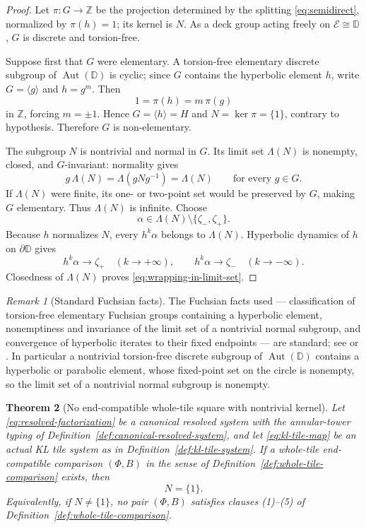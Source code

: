 \documentclass[11pt,reqno]{amsart}
\newtheorem{theorem}{Theorem}[section]
\theoremstyle{definition}
\theoremstyle{remark}
\newtheorem{remark}[theorem]{Remark}
\begin{document}
\begin{proof}
Let \(\pi\colon G\to\mathbb Z\) be the projection determined by the splitting \eqref{eq:semidirect}, normalized by \(\pi(h)=1\); its kernel is \(N\).  As a deck group acting freely on \(\mathcal E\cong\mathbb D\), \(G\) is discrete and torsion-free.

Suppose first that \(G\) were elementary.  A torsion-free elementary discrete subgroup of \(\operatorname{Aut}(\mathbb D)\) is cyclic; since \(G\) contains the hyperbolic element \(h\), write \(G=\langle g\rangle\) and \(h=g^m\).  Then
\[
1=\pi(h)=m\,\pi(g)
\]
in \(\mathbb Z\), forcing \(m=\pm1\).  Hence \(G=\langle h\rangle=H\) and \(N=\ker\pi=\{1\}\), contrary to hypothesis.  Therefore \(G\) is non-elementary.

The subgroup \(N\) is nontrivial and normal in \(G\).  Its limit set \(\Lambda(N)\) is nonempty, closed, and \(G\)-invariant: normality gives
\[
g\,\Lambda(N)=\Lambda(gNg^{-1})=\Lambda(N)
\qquad\text{for every } g\in G.
\]
If \(\Lambda(N)\) were finite, its one- or two-point set would be preserved by \(G\), making \(G\) elementary.  Thus \(\Lambda(N)\) is infinite.  Choose
\[
\alpha\in\Lambda(N)\setminus\{\zeta_-,\zeta_+\}.
\]
Because \(h\) normalizes \(N\), every \(h^k\alpha\) belongs to \(\Lambda(N)\).  Hyperbolic dynamics of \(h\) on \(\partial\mathbb D\) gives
\[
h^k\alpha\to\zeta_+\quad(k\to+\infty),
\qquad
h^k\alpha\to\zeta_-\quad(k\to-\infty).
\]
Closedness of \(\Lambda(N)\) proves \eqref{eq:wrapping-in-limit-set}.
\end{proof}

\begin{remark}[Standard Fuchsian facts]\label{rem:fuchsian-facts}
The Fuchsian facts used --- classification of torsion-free elementary
Fuchsian groups containing a hyperbolic element, nonemptiness and
invariance of the limit set of a nontrivial normal subgroup, and
convergence of hyperbolic iterates to their fixed endpoints --- are
standard; see \cite{Beardon83} or \cite{Katok92}.  In particular a
nontrivial torsion-free discrete subgroup of
$\operatorname{Aut}(\mathbb D)$ contains a hyperbolic or parabolic
element, whose fixed-point set on the circle is nonempty, so the limit
set of a nontrivial normal subgroup is nonempty.
\end{remark}
\begin{theorem}[No end-compatible whole-tile square with nontrivial kernel]\label{thm:whole-tile-no-go}
Let \eqref{eq:resolved-factorization} be a canonical resolved system with the annular-tower typing of Definition~\ref{def:canonical-resolved-system}, and let \eqref{eq:kl-tile-map} be an actual KL tile system as in Definition~\ref{def:kl-tile-system}.  If a whole-tile end-compatible comparison \((\Phi,B)\) in the sense of Definition~\ref{def:whole-tile-comparison} exists, then
\begin{equation}\label{eq:forced-trivial-kernel}
N=\{1\}.
\end{equation}
Equivalently, if \(N\ne\{1\}\), no pair \((\Phi,B)\) satisfies clauses (1)--(5) of Definition~\ref{def:whole-tile-comparison}.
\end{theorem}
\end{document}
